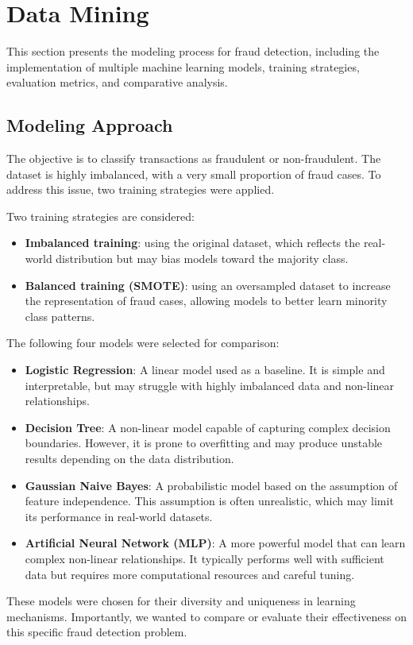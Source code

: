 \newpage

\section{Data Mining}

This section presents the modeling process for fraud detection, including the implementation of multiple machine learning models, training strategies, evaluation metrics, and comparative analysis.

\subsection{Modeling Approach}

The objective is to classify transactions as fraudulent or non-fraudulent. The dataset is highly imbalanced, with a very small proportion of fraud cases. To address this issue, two training strategies were applied.

Two training strategies are considered:
\begin{itemize}
    \item \textbf{Imbalanced training}: using the original dataset, which reflects the real-world distribution but may bias models toward the majority class.
    
    \item \textbf{Balanced training (SMOTE)}: using an oversampled dataset to increase the representation of fraud cases, allowing models to better learn minority class patterns.
\end{itemize}

The following four models were selected for comparison:
\begin{itemize}
    \item \textbf{Logistic Regression}: A linear model used as a baseline. It is simple and interpretable, but may struggle with highly imbalanced data and non-linear relationships.
    
    \item \textbf{Decision Tree}: A non-linear model capable of capturing complex decision boundaries. However, it is prone to overfitting and may produce unstable results depending on the data distribution.
    
    \item \textbf{Gaussian Naive Bayes}: A probabilistic model based on the assumption of feature independence. This assumption is often unrealistic, which may limit its performance in real-world datasets.
    
    \item \textbf{Artificial Neural Network (MLP)}: A more powerful model that can learn complex non-linear relationships. It typically performs well with sufficient data but requires more computational resources and careful tuning.
\end{itemize}
These models were chosen for their diversity and uniqueness in learning mechanisms. Importantly, we wanted to compare or evaluate their effectiveness on this specific fraud detection problem.


